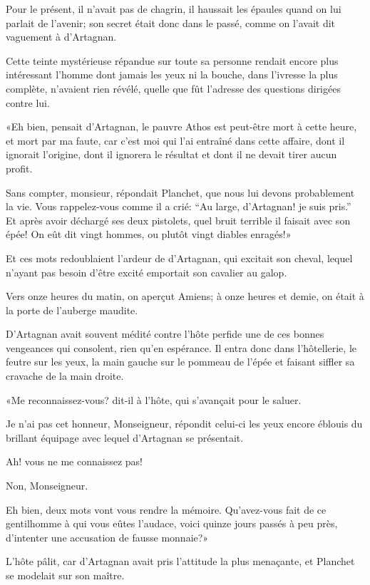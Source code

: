 Pour le présent, il n'avait pas de chagrin, il haussait les épaules quand on lui parlait de l'avenir; son secret était donc dans le passé, comme on l'avait dit vaguement à d'Artagnan. 

Cette teinte mystérieuse répandue sur toute sa personne rendait encore plus intéressant l'homme dont jamais les yeux ni la bouche, dans l'ivresse la plus complète, n'avaient rien révélé, quelle que fût l'adresse des questions dirigées contre lui. 

«Eh bien, pensait d'Artagnan, le pauvre Athos est peut-être mort à cette heure, et mort par ma faute, car c'est moi qui l'ai entraîné dans cette affaire, dont il ignorait l'origine, dont il ignorera le résultat et dont il ne devait tirer aucun profit. 

\speak  Sans compter, monsieur, répondait Planchet, que nous lui devons probablement la vie. Vous rappelez-vous comme il a crié: “Au large, d'Artagnan! je suis pris.” Et après avoir déchargé ses deux pistolets, quel bruit terrible il faisait avec son épée! On eût dit vingt hommes, ou plutôt vingt diables enragés!» 

Et ces mots redoublaient l'ardeur de d'Artagnan, qui excitait son cheval, lequel n'ayant pas besoin d'être excité emportait son cavalier au galop. 

Vers onze heures du matin, on aperçut Amiens; à onze heures et demie, on était à la porte de l'auberge maudite. 

D'Artagnan avait souvent médité contre l'hôte perfide une de ces bonnes vengeances qui consolent, rien qu'en espérance. Il entra donc dans l'hôtellerie, le feutre sur les yeux, la main gauche sur le pommeau de l'épée et faisant siffler sa cravache de la main droite. 

«Me reconnaissez-vous? dit-il à l'hôte, qui s'avançait pour le saluer. 

\speak  Je n'ai pas cet honneur, Monseigneur, répondit celui-ci les yeux encore éblouis du brillant équipage avec lequel d'Artagnan se présentait. 

\speak  Ah! vous ne me connaissez pas! 

\speak  Non, Monseigneur. 

\speak  Eh bien, deux mots vont vous rendre la mémoire. Qu'avez-vous fait de ce gentilhomme à qui vous eûtes l'audace, voici quinze jours passés à peu près, d'intenter une accusation de fausse monnaie?» 

L'hôte pâlit, car d'Artagnan avait pris l'attitude la plus menaçante, et Planchet se modelait sur son maître. 

